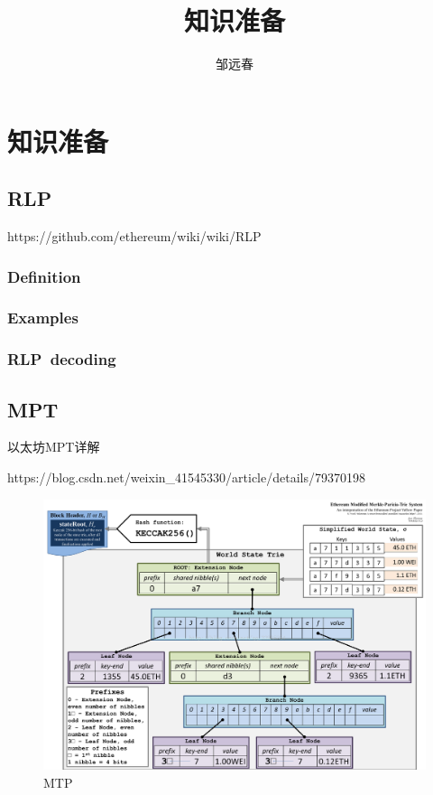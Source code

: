 \documentclass[UTF8]{ctexart}
\title{知识准备}
\author{邹远春}
\date{}
\begin{document}
\maketitle
\else
\chapter{知识准备}
\fi
\section{RLP}

https://github.com/ethereum/wiki/wiki/RLP

\subsection{Definition}

\subsection{Examples}

\subsection{RLP~decoding}

\section{MPT}

以太坊MPT详解

https://blog.csdn.net/weixin\_41545330/article/details/79370198

\begin{figure}
	\centering
	\includegraphics{rlp.png}
	\caption{MTP}
	\label{rlp}
\end{figure}
\end{document}
